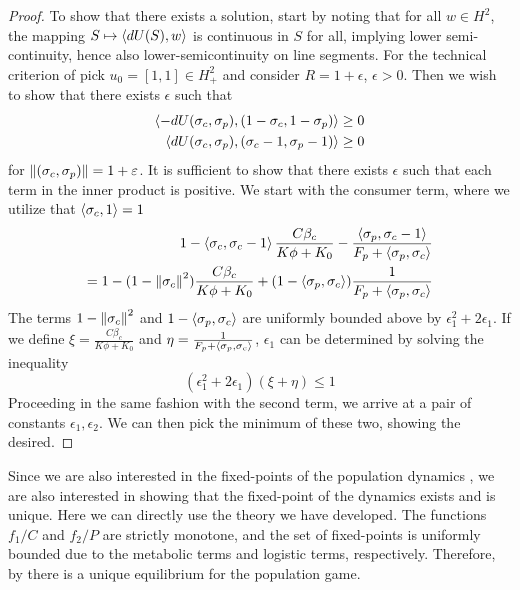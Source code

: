 \begin{proof}
  To show that there exists a solution, start by noting that for all $w\in H^2$, the mapping $S \mapsto \left \langle dU(S),w \right \rangle$ is continuous in $S$ for all, implying lower semi-continuity, hence also lower-semicontinuity on line segments.
  For the technical criterion of  pick $u_0 = [1,1] \in H_+^2$ and consider $R=1+\epsilon$, $\epsilon>0$. Then we wish to show that there exists $\epsilon$ such that
  \begin{equation}
    \begin{split}
    \left \langle -dU(\sigma_c,\sigma_p),(1-\sigma_c, 1-\sigma_p) \right \rangle \geq 0 \\
    \left \langle dU(\sigma_c,\sigma_p),(\sigma_c-1, \sigma_p-1) \right \rangle \geq 0
  \end{split}
  \end{equation}
  for $\left \Vert (\sigma_c,\sigma_p) \right \Vert = 1+\varepsilon$.
  It is sufficient to show that there exists $\epsilon$ such that each term in the inner product is positive. We start with the consumer term, where we utilize that $\left \langle \sigma_c,1 \right \rangle=1$
  \begin{equation}
    \begin{split}
    1-\ip{\sigma_c}{\sigma_c-1}\frac{ C \beta_c }{K\phi + K_0} - \frac{\ip{\sigma_p}{\sigma_c-1}}{F_p + \ip{\sigma_p}{\sigma_c}} \\
     =1-(1-\norm{\sigma_c}^2)\frac{ C \beta_c }{K\phi + K_0}+(1-\ip{\sigma_p}{\sigma_c})\frac{1}{F_p + \ip{\sigma_p}{\sigma_c}}
  \end{split}
  \end{equation}
  The terms $1-\left \Vert \sigma_c \right \Vert^2$ and $1-\left \langle \sigma_p,\sigma_c \right \rangle$ are uniformly bounded above by $\epsilon_1^2+2\epsilon_1$. If we define $\xi = \frac{C \beta_c }{K\phi + K_0}$ and $\eta = \frac{1}{F_p + \left \langle \sigma_p,\sigma_c \right \rangle}$, $\epsilon_1$ can be determined by solving the inequality
  \begin{equation}
    (\epsilon_1^2+2\epsilon_1)(\xi+\eta) \leq 1
  \end{equation}
  Proceeding in the same fashion with the second term, we arrive at a pair of constants $\epsilon_1,\epsilon_2$. We can then pick the minimum of these two, showing the desired.
\end{proof}
Since we are also interested in the fixed-points of the population dynamics , we are also interested in showing that the fixed-point of the dynamics exists and is unique. Here we can directly use the theory we have developed.  The functions $f_1/C$ and $f_2/P$ are strictly monotone, and the set of fixed-points is uniformly bounded due to the metabolic terms and logistic terms, respectively. Therefore, by  there is a unique equilibrium for the population game.


